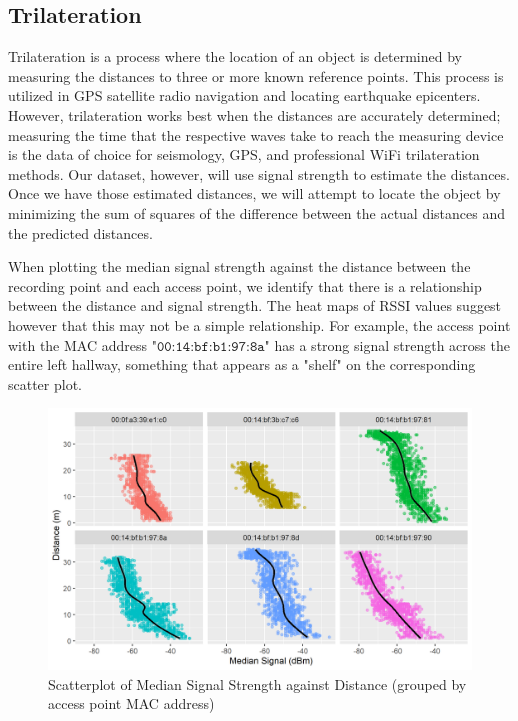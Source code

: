 \documentclass[12pt, conference]{IEEEtran}
\begin{document}
\subsection{Trilateration}
Trilateration is a process where the location of an object is determined by measuring the distances to three or more known reference points. This process is utilized in GPS satellite radio navigation and locating earthquake epicenters. However, trilateration works best when the distances are accurately determined; measuring the time that the respective waves take to reach the measuring device is the data of choice for seismology, GPS, and professional WiFi trilateration methods. Our dataset, however, will use signal strength to estimate the distances. Once we have those estimated distances, we will attempt to locate the object by minimizing the sum of squares of the difference between the actual distances and the predicted distances.

When plotting the median signal strength against the distance between the recording point and each access point, we identify that there is a relationship between the distance and signal strength. The heat maps of RSSI values suggest however that this may not be a simple relationship. For example, the access point with the MAC address $\texttt{"00:14:bf:b1:97:8a"}$ has a strong signal strength across the entire left hallway, something that appears as a "shelf" on the corresponding scatter plot.

\begin{figure}[htbp]
  \centerline{\includegraphics[width=\columnwidth]{img/distance_against_median_signal.png}}
  \caption{Scatterplot of Median Signal Strength against Distance (grouped by access point MAC address)}
  \label{fig: Distance Distribution}
\end{figure}
\end{document}
